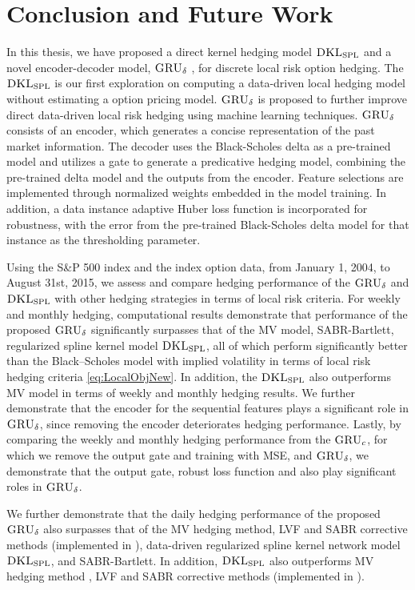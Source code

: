 \documentclass[letterpaper,12pt,titlepage,oneside,final]{book}
\numberwithin{equation}{section}
\theoremstyle{definition}
\newcommand{\model}{\textsc{GRU}_\delta}
\newcommand{\DKLs}{\bf\textsc{DKL}_{\text{SPL}}}
\begin{document}
\chapter{Conclusion and Future Work}
\label{sec:Conclusion}

In this thesis, we have proposed a direct kernel hedging model $\DKLs$ and a novel encoder-decoder  model, $\model$ , for discrete local risk option hedging. The $\DKLs$ is our first exploration on computing a data-driven local hedging model without estimating a option pricing model. $\model$ is proposed to further improve direct data-driven local risk hedging using machine learning techniques. $\model$ consists of an encoder, which generates a concise representation of the past market  information. The decoder uses the Black-Scholes delta as a pre-trained model and utilizes a gate to generate a predicative hedging model,  combining the pre-trained delta model and the outputs from the encoder. Feature selections are implemented through normalized weights embedded in the model training. In addition, a data instance adaptive Huber loss function is incorporated  for robustness, with the error from the pre-trained Black-Scholes delta model for that instance as the thresholding parameter. 

Using the S\&P 500 index and the index option data,  from January 1, 2004, to  August 31st, 2015, we assess and compare hedging performance of the  $\model$ and $\DKLs$ with other hedging strategies in terms of local risk criteria.
For weekly and monthly hedging, computational results demonstrate that performance of the proposed $\model$  significantly surpasses that of the MV model, SABR-Bartlett, regularized spline kernel model $\DKLs$, all of which perform significantly better than the Black–Scholes model with implied volatility in terms of local risk hedging criteria \eqref{eq:LocalObjNew}.
In addition, the $\DKLs$ also outperforms MV model in terms of weekly and monthly hedging results.
We further demonstrate that the encoder for the sequential features plays a significant role in $\model$, since removing the encoder deteriorates hedging performance.
Lastly, by comparing the weekly and monthly hedging performance from the  $\textsc{GRU}_{c}$, for which we remove the output gate and training with MSE, and $\model$, we demonstrate that the output gate,  robust loss function and  also play  significant roles in $\model$.

We further demonstrate that the daily hedging performance of the proposed $\model$  also surpasses that of the MV hedging method, LVF and SABR corrective methods  (implemented in \cite{hulloptimal}), data-driven regularized spline kernel network model $\DKLs$, and SABR-Bartlett. In addition, $\DKLs$ also outperforms MV hedging method , LVF and SABR corrective methods  (implemented in \cite{hulloptimal}).
\end{document}

